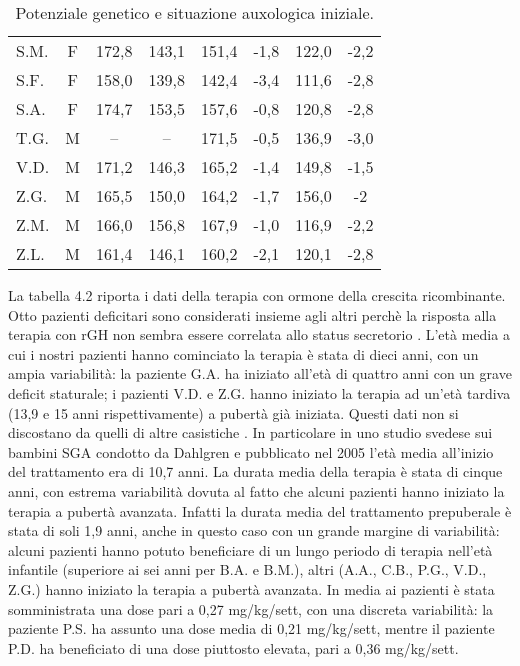 \begin{table}[!h]
\begin{center}
\begin{tabular}{lccccccc}
S.M.	& F & 172,8 & 143,1 & 151,4 & -1,8 	        	& 122,0 & -2,2  \\
S.F.	& F & 158,0 & 139,8 & 142,4 & -3,4 	  		& 111,6 & -2,8  \\
S.A.	& F & 174,7 & 153,5 & 157,6 & -0,8 	  		& 120,8 & -2,8  \\
T.G.    & M & --    & --    & 171,5 & -0,5    			& 136,9 & -3,0  \\
V.D.	& M & 171,2 & 146,3 & 165,2 & -1,4 	  		& 149,8 & -1,5  \\
Z.G.	& M & 165,5 & 150,0 & 164,2 & -1,7 	  		& 156,0 & -2     \\
Z.M.	& M & 166,0 & 156,8 & 167,9 & -1,0 	  		& 116,9 & -2,2  \\
Z.L.	& M & 161,4 & 146,1 & 160,2 & -2,1 	  		& 120,1 & -2,8  \\
\bottomrule
\end{tabular}
\end{center}
\caption{Potenziale genetico e situazione auxologica iniziale.}
\label{tab:SituazioneIniziale}
\end{table}

La tabella 4.2 riporta i dati della terapia con ormone della crescita ricombinante. 
Otto pazienti deficitari sono considerati insieme agli altri perchè la risposta alla terapia con rGH non sembra essere correlata allo status secretorio\cite{lee2003international} \cite{de2005growth}.  L'età media a cui i nostri pazienti hanno cominciato la terapia è stata di dieci anni, con un ampia variabilità: la paziente G.A. ha iniziato all'età di quattro anni con un grave deficit staturale; i pazienti V.D. e Z.G. hanno iniziato la terapia ad un'età tardiva (13,9 e 15 anni rispettivamente) a pubertà già iniziata. Questi dati non si discostano da quelli di altre casistiche\cite{coutant1998short} \cite{zucchini2001final}.
In particolare in uno studio svedese sui bambini SGA condotto da Dahlgren e pubblicato nel 2005 l'età media all'inizio del trattamento era di 10,7 anni\cite{dahlgren2005final}.
La durata media della terapia è stata di cinque anni, con estrema variabilità dovuta al fatto che alcuni pazienti hanno iniziato la terapia a pubertà avanzata. Infatti la durata media del trattamento prepuberale è stata di soli 1,9 anni, anche in questo caso con un grande margine di variabilità: alcuni pazienti hanno potuto beneficiare di un lungo periodo di terapia nell'età infantile (superiore ai sei anni per B.A. e B.M.), altri (A.A., C.B., P.G., V.D., Z.G.) hanno iniziato la terapia a pubertà avanzata. 
In media ai pazienti è stata somministrata una dose pari a 0,27 mg/kg/sett, con una discreta variabilità: la paziente P.S. ha assunto una dose media di 0,21 mg/kg/sett, mentre il paziente P.D. ha beneficiato di una dose piuttosto elevata, pari a 0,36 mg/kg/sett. 
  
